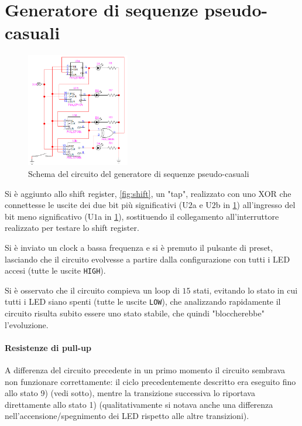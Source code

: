 \documentclass[a4paper,10pt]{article}
\def\code#1{\texttt{#1}}
\begin{document}
\section{Generatore di sequenze pseudo-casuali}

\begin{figure}
	\vspace{-5pt}
	\centering
	\includegraphics[width=0.4\textwidth]{../grafici/randomseq.png}
	\vspace{-5pt}
	\caption{Schema del circuito del generatore di sequenze pseudo-casuali}
	\label{fig:random}
	\vspace{-5pt}
\end{figure}

Si è aggiunto allo shift register, \cref{fig:shift}, un "tap", realizzato con uno XOR che connettesse le uscite dei due bit più significativi (U$2$a e U$2$b in \cref{fig:random}) all'ingresso del bit meno significativo (U$1$a in \cref{fig:random}), sostituendo il collegamento all'interruttore realizzato per testare lo shift register.
\newline

Si è inviato un clock a bassa frequenza e si è premuto il pulsante di preset, lasciando che il circuito evolvesse a partire dalla configurazione con tutti i LED accesi (tutte le uscite \code{HIGH}).

Si è osservato che il circuito compieva un loop di $15$ stati, evitando lo stato in cui tutti i LED siano spenti (tutte le uscite \code{LOW}), che analizzando rapidamente il circuito risulta subito essere uno stato stabile, che quindi "bloccherebbe" l'evoluzione.

\paragraph{Resistenze di pull-up}A differenza del circuito precedente in un primo momento il circuito sembrava non funzionare correttamente: il ciclo precedentemente descritto era eseguito fino allo stato 9) (vedi sotto), mentre la transizione successiva lo riportava direttamente allo stato 1) (qualitativamente si notava anche una differenza nell'accensione/spegnimento dei LED rispetto alle altre transizioni).
\end{document}
